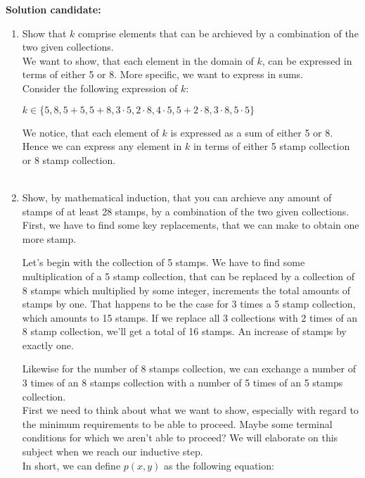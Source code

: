 \documentclass{report}
\newcommand{\cent}[1]{\begin{center}#1\end{center}}
\newcommand{\In}{\! \in \!}
\newcommand{\Solution}{\textbf{Solution candidate: }}
\newcommand{\QED}{\boxed{}}
\newcommand{\defaultEnumerateLabel}{\textbf{\alph*.}}
\newcommand{\MyItem}[1]{\item #1\\}
\begin{document}
 	\Solution
 	\begin{enumerate}[label=\defaultEnumerateLabel]
 		\MyItem{Show that $k$ comprise elements that can be archieved by a combination of the two given collections.}
 		
 		We want to show, that each element in the domain of $k$, can be expressed in terms of either 5 or 8. More specific, we want to express in sums.\\
 		
 		Consider the following expression of $k$:
 		
 		\cent{$k \In \{5,8,5 + 5,5+8,3 \cdot 5,2 \cdot 8,4 \cdot 5,5+ 2 \cdot 8,3 \cdot 8,5 \cdot 5\}$}
 		
 		We notice, that each element of $k$ is expressed as a sum of either 5 or 8. Hence we can express any element in $k$ in terms of either 5 stamp collection or 8 stamp collection.\\
 		\QED\\
 		
 		\MyItem{Show, by mathematical induction, that you can archieve any amount of stamps of at least 28 stamps, by a combination of the two given collections.}
 		
 		First, we have to find some key replacements, that we can make to obtain one more stamp.
 		
 		Let's begin with the collection of 5 stamps. We have to find some multiplication of a 5 stamp collection, that can be replaced by a collection of 8 stamps which multiplied by some integer, increments the total amounts of stamps by one. That happens to be the case for 3 times a 5 stamp collection, which amounts to 15 stamps. If we replace all 3 collections with 2 times of an 8 stamp collection, we'll get a total of 16 stamps. An increase of stamps by exactly one. 
 		
 		Likewise for the number of 8 stamps collection, we can exchange a number of 3 times of an 8 stamps collection with a number of 5 times of an 5 stamps collection.\\
 		
 		First we need to think about what we want to show, especially with regard to the minimum requirements to be able to proceed. Maybe some terminal conditions for which we aren't able to proceed? We will elaborate on this subject when we reach our inductive step.\\
 		
 		In short, we can define $p(x,y)$ as the following equation:
 		

\end{enumerate}
\end{document}
